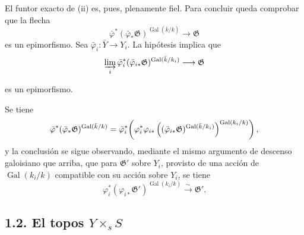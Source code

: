 El funtor exacto de (ii) es, pues, plenamente fiel. Para concluir queda
comprobar que la flecha
\begin{equation*}
\bar\varphi^*(\bar\varphi_*\mathfrak G)^{
  \operatorname{Gal}(\bar k/k)}\longrightarrow\mathfrak G
\end{equation*}
es un epimorfismo. Sea $\bar\varphi_i:\bar Y\longrightarrow Y_i$. La
hipótesis implica que
\begin{equation*}
\varinjlim_i
\bar\varphi_i^*(\bar\varphi_{i*}\mathfrak G)^{
  \operatorname{Gal}(\bar k/k_i)}
\longrightarrow\mathfrak G
\end{equation*}
\pageoriginale

es un epimorfismo.

Se tiene
\begin{equation*}
\bar\varphi^*(\sisi{\varphi_*}{\bar\varphi_*}\mathfrak G)^{
  \operatorname{Gal}(\bar k/k)}
=
\bar\varphi_i^*\!\left(
  \varphi_i^*\varphi_{i*}
  \left((\bar\varphi_{i*}\mathfrak G)^{
    \operatorname{Gal}(\bar k/k_i)}\right)^{
    \operatorname{Gal}(k_i/k)}
\right),
\end{equation*}
y la conclusión se sigue observando, mediante el mismo argumento de descenso
galoisiano que arriba, que para $\mathfrak G'$ sobre $Y_i$, provisto de una
acción de $\operatorname{Gal}(k_i/k)$ compatible con su acción sobre $Y_i$,
se tiene
\begin{equation*}
\varphi_i^*(\varphi_{i*}\mathfrak G')^{
  \operatorname{Gal}(k_i/k)}
\xrightarrow{\sim}\mathfrak G'.
\end{equation*}

\subsection*{\texorpdfstring{1.2. El topos $Y\times_s S$}{1.2. El topos Y por S sobre s}}

